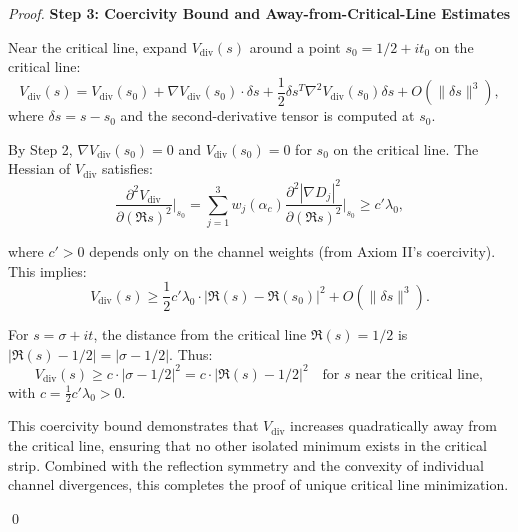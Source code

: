 \begin{theorem}
\begin{theorem}
\begin{proof}
\textbf{Step 3: Coercivity Bound and Away-from-Critical-Line Estimates}

Near the critical line, expand $V_{\mathrm{div}}(s)$ around a point $s_0 = 1/2 + i t_0$ on the critical line:
\begin{equation}
V_{\mathrm{div}}(s) = V_{\mathrm{div}}(s_0) + \nabla V_{\mathrm{div}}(s_0) \cdot \delta s + \frac{1}{2} \delta s^T \nabla^2 V_{\mathrm{div}}(s_0) \delta s + O(\|\delta s\|^3),
\end{equation}
where $\delta s = s - s_0$ and the second-derivative tensor is computed at $s_0$.

By Step 2, $\nabla V_{\mathrm{div}}(s_0) = 0$ and $V_{\mathrm{div}}(s_0) = 0$ for $s_0$ on the critical line. The Hessian of $V_{\mathrm{div}}$ satisfies:
\begin{equation}
\frac{\partial^2 V_{\mathrm{div}}}{\partial (\Re s)^2}\bigg|_{s_0} = \sum_{j=1}^3 w_j(\alpha_c) \frac{\partial^2 |\nabla D_j|^2}{\partial (\Re s)^2}\bigg|_{s_0} \geq c' \lambda_0,
\end{equation}

where $c' > 0$ depends only on the channel weights (from Axiom II's coercivity). This implies:
\begin{equation}
V_{\mathrm{div}}(s) \geq \frac{1}{2} c' \lambda_0 \cdot |\Re(s) - \Re(s_0)|^2 + O(\|\delta s\|^3).
\end{equation}

For $s = \sigma + it$, the distance from the critical line $\Re(s) = 1/2$ is $|\Re(s) - 1/2| = |\sigma - 1/2|$. Thus:
\begin{equation}
V_{\mathrm{div}}(s) \geq c \cdot |\sigma - 1/2|^2 = c \cdot |\Re(s) - 1/2|^2 \quad \text{for } s \text{ near the critical line},
\end{equation}
with $c = \frac{1}{2} c' \lambda_0 > 0$.

This coercivity bound demonstrates that $V_{\mathrm{div}}$ increases quadratically away from the critical line, ensuring that no other isolated minimum exists in the critical strip. Combined with the reflection symmetry and the convexity of individual channel divergences, this completes the proof of unique critical line minimization.

\qed

\end{proof}

\end{theorem}

\begin{lemma}
\label{lem:reflectionSymmetryExplicit}


\end{lemma}
\end{theorem}
